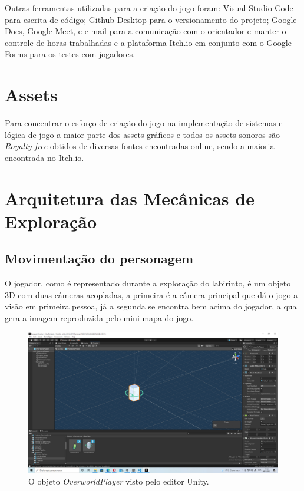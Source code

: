 \documentclass[
	12pt,				%
	openright,			%
	twoside,			%
	a4paper,			%
	english,			%
	french,				%
	spanish,			%
	brazil				%
	]{abntex2}
\begin{document}
Outras ferramentas utilizadas para a criação do jogo foram: Visual Studio Code para escrita de código;
Github Desktop para o versionamento do projeto; Google Docs, Google Meet, e e-mail para a
comunicação com o orientador e manter o controle de horas trabalhadas e a plataforma Itch.io em conjunto com o Google Forms para os testes com jogadores.
\pagebreak
\section{Assets}

Para concentrar o esforço de criação do jogo na implementação de sistemas e lógica de jogo a maior parte dos assets gráficos e todos os assets sonoros são \emph{Royalty-free} obtidos de diversas fontes encontradas online, sendo a maioria encontrada no Itch.io. %


\section{Arquitetura das Mecânicas de Exploração}


\subsection{Movimentação do personagem}

O jogador, como é representado durante a exploração do labirinto, é um objeto 3D com duas câmeras acopladas, a primeira é a câmera principal que dá o jogo a visão em primeira pessoa, já a segunda se encontra bem acima do jogador, a qual gera a imagem reproduzida pelo mini mapa do jogo.
 

\begin{figure}[h!]
 \centering
  \includegraphics[width=0.65\linewidth]{playerobject.jpg}
  \caption{O objeto \emph{OverworldPlayer} visto pelo editor Unity.}
  \label{fig:playerobject}
\end{figure}
	
\end{document}
